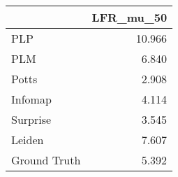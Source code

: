 \begin{tabular}{lr}
\toprule
{} & LFR_mu_50 \\
\midrule
PLP          &    10.966 \\
PLM          &     6.840 \\
Potts        &     2.908 \\
Infomap      &     4.114 \\
Surprise     &     3.545 \\
Leiden       &     7.607 \\
Ground Truth &     5.392 \\
\bottomrule
\end{tabular}
